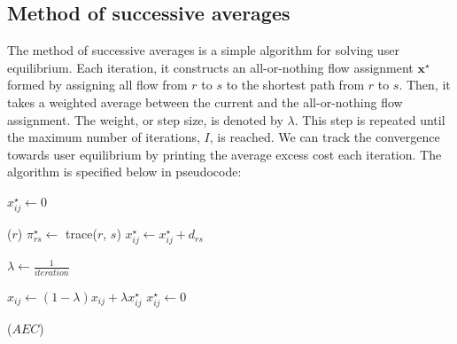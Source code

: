 \documentclass[11pt]{article}
\newcommand{\A}{\mathcal{A}}
\newcommand{\Z}{\mathcal{Z}}
\begin{document}
\subsection{Method of successive averages}


The method of successive averages is a simple algorithm for solving user equilibrium. Each iteration, it constructs an all-or-nothing flow assignment $\mathbf{x}^\star$ formed by assigning all flow from $r$ to $s$ to the shortest path from $r$ to $s$. Then, it takes a weighted average between the current and the all-or-nothing flow assignment. The weight, or step size, is denoted by $\lambda$. 
This step is repeated until the maximum number of iterations, $I$, is reached. We can track the convergence towards user equilibrium by printing the average excess cost each iteration.
The algorithm is specified below in pseudocode:

\vspace{\baselineskip}

\begin{algorithmic}[1]
	\For{$(i,j)\in\A$} 
	\State $x^\star_{ij} \leftarrow 0$
	\EndFor
	
	\vspace{0.5\baselineskip}
	
	 \label{msa5}
	\For{$r\in\Z$}  \label{msa6}
	($r$) 
	\For{$s\in\Z$}
	\State $\pi^\star_{rs} \leftarrow$ {\sc trace($r$, $s$)}
	 
	\State $x^\star_{ij} \leftarrow x^\star_{ij} + d_{rs}$ \label{msa11}
	\EndFor
	\EndFor
	\EndFor \label{msa14}
	
	\vspace{0.5\baselineskip}
	
	
	\State $\lambda \leftarrow \frac{1}{iteration}$  \label{msa15}
	
	\vspace{0.5\baselineskip}
	
	\For{$(i,j)\in\A$}  \label{msa16}
	\State $x_{ij} \leftarrow (1-\lambda)x_{ij} + \lambda x^\star_{ij}$ \label{msa17}
	\State $x^\star_{ij}\leftarrow 0$ \label{msa18}
	\EndFor
	
	\vspace{0.5\baselineskip}
	
	($AEC$) 
	
	\EndFor
	\EndProcedure
\end{algorithmic}
\end{document}
